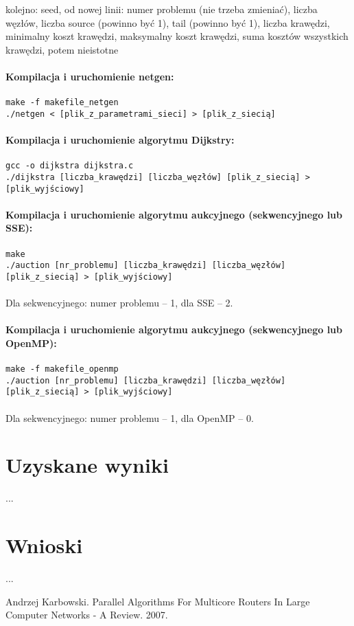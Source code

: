 \documentclass[12pt,a4paper]{article}
\begin{document}
kolejno: seed, od nowej linii: numer problemu (nie trzeba zmieniać), liczba węzłów, liczba source (powinno być 1), tail (powinno być 1), liczba krawędzi, minimalny koszt krawędzi, maksymalny koszt krawędzi, suma kosztów wszystkich krawędzi, potem nieistotne\\\\
\textbf{Kompilacja i uruchomienie netgen:}\\\\
\texttt{make -f makefile\_netgen\\
./netgen < [plik\_z\_parametrami\_sieci] > [plik\_z\_siecią]}\\\\
\textbf{Kompilacja i uruchomienie algorytmu Dijkstry:}\\\\
\texttt{gcc -o dijkstra dijkstra.c\\
./dijkstra [liczba\_krawędzi] [liczba\_węzłów] [plik\_z\_siecią] > [plik\_wyjściowy]}\\\\
\textbf{Kompilacja i uruchomienie algorytmu aukcyjnego (sekwencyjnego lub SSE):}\\\\
\texttt{make\\
./auction [nr\_problemu] [liczba\_krawędzi] [liczba\_węzłów] [plik\_z\_siecią] > [plik\_wyjściowy]\\\\}
Dla sekwencyjnego: numer problemu -- 1, dla SSE -- 2.\\\\
\textbf{Kompilacja i uruchomienie algorytmu aukcyjnego (sekwencyjnego lub OpenMP):}\\\\
\texttt{make -f makefile\_openmp\\
./auction [nr\_problemu] [liczba\_krawędzi] [liczba\_węzłów] [plik\_z\_siecią] > [plik\_wyjściowy]\\\\}
Dla sekwencyjnego: numer problemu -- 1, dla OpenMP -- 0.
\section{Uzyskane wyniki}
...
\section{Wnioski}
...
\begin{thebibliography}{1}
Andrzej Karbowski. Parallel Algorithms For Multicore Routers In Large Computer Networks - A Review. 2007.
\end{thebibliography}
\end{document}
